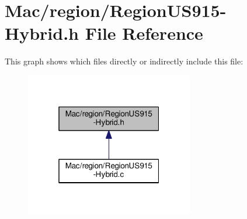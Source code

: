 \hypertarget{RegionUS915-Hybrid_8h}{}\section{Mac/region/\+Region\+U\+S915-\/\+Hybrid.h File Reference}
\label{RegionUS915-Hybrid_8h}
This graph shows which files directly or indirectly include this file\+:
\nopagebreak
\begin{figure}[H]
\begin{center}
\leavevmode
\includegraphics[width=208pt]{RegionUS915-Hybrid_8h__dep__incl}
\end{center}
\end{figure}
